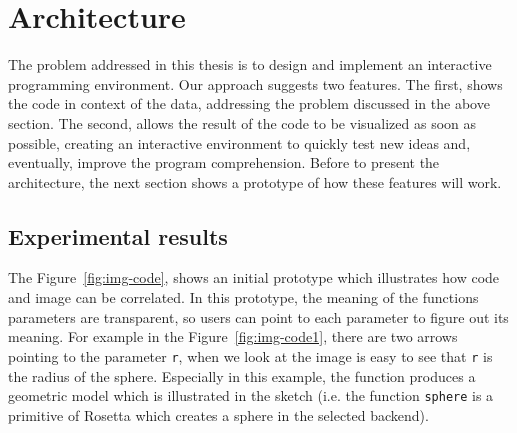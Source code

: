 
% 
% 

\section{Architecture}
\label{sec:arch}

The problem addressed in this thesis is to design and implement an interactive programming environment. Our approach suggests two features. The first, shows the code in context of the data, addressing the problem discussed in the above section. The second, allows the result of the code to be visualized as soon as possible, creating an interactive environment to quickly test new ideas and, eventually, improve the program comprehension. Before to present the architecture, the next section shows a prototype of how these features will work.

\subsection{Experimental results}

The Figure~\ref{fig:img-code}, shows an initial prototype which illustrates how code and image can be correlated. In this prototype, the meaning of the functions parameters are transparent, so users can point to each parameter to figure out its meaning. For example in the Figure~\ref{fig:img-code1}, there are two arrows pointing to the parameter \texttt{r}, when we look at the image is easy to see that \texttt{r} is the radius of the sphere. Especially in this example, the function produces a geometric model which is illustrated in the sketch (i.e. the function \texttt{sphere} is a primitive of Rosetta which creates a sphere in the selected backend).

